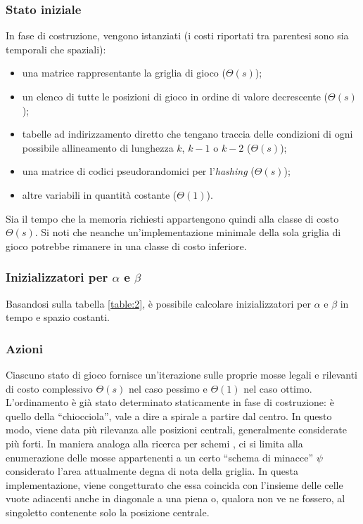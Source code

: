 \documentclass{article}
\begin{document}
\subsubsection{Stato iniziale}

In fase di costruzione, vengono istanziati (i costi riportati tra parentesi
sono sia temporali che spaziali):
\begin{itemize}
  \item una matrice rappresentante la griglia di gioco ($\varTheta(s)$);
  \item un elenco di tutte le posizioni di gioco in ordine di valore decrescente
    ($\varTheta(s)$);
  \item tabelle ad indirizzamento diretto che tengano traccia delle condizioni
    di ogni possibile allineamento di lunghezza $k$, $k - 1$ o $k - 2$
    ($\varTheta(s)$);
  \item una matrice di codici pseudorandomici per l'\emph{hashing}
    ($\varTheta(s)$);
  \item altre variabili in quantità costante ($\varTheta(1)$).
\end{itemize}

Sia il tempo che la memoria richiesti appartengono quindi alla classe di costo
$\varTheta(s)$. Si noti che neanche un'implementazione minimale della sola
griglia di gioco potrebbe rimanere in una classe di costo inferiore. 

\subsubsection{Inizializzatori per $\alpha$ e $\beta$}

Basandosi sulla tabella \ref{table:2}, è possibile calcolare inizializzatori per
$\alpha$ e $\beta$ in tempo e spazio costanti.

\subsubsection{Azioni} \label{pattern-search}

Ciascuno stato di gioco fornisce un'iterazione sulle proprie mosse legali e
rilevanti di costo complessivo $\varTheta(s)$ nel caso pessimo e $\varTheta(1)$
nel caso ottimo. L'ordinamento è già stato determinato staticamente in fase di
costruzione: è quello della ``chiocciola'', vale a dire a spirale a partire dal
centro. In questo modo, viene data più rilevanza alle posizioni centrali,
generalmente considerate più forti. In maniera analoga alla ricerca per schemi
\cite{VANDENHERIK2002277}, ci si limita alla enumerazione delle mosse
appartenenti a un certo ``schema di minacce'' $\psi$ considerato l'area
attualmente degna di nota della griglia. In questa implementazione, viene
congetturato che essa coincida con l'insieme delle celle vuote adiacenti anche
in diagonale a una piena o, qualora non ve ne fossero, al singoletto contenente
solo la posizione centrale.
\end{document}
